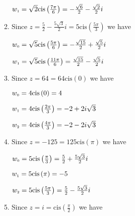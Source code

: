 \documentclass{ximera}
\begin{document}
\begin{enumerate}
\begin{multicols}{2}
$w_{\text{\tiny$1$}} = \sqrt{2}\text{cis}\left(\frac{7\pi}{6}\right) = -\frac{\sqrt{6}}{2}-\frac{\sqrt{2}}{2} i$

\end{multicols}

\item Since $z=\frac{5}{2} - \frac{5\sqrt{3}}{2}i = 5\text{cis}\left(\frac{5\pi}{3}\right)$ we have 

\begin{multicols}{2}

$w_{\text{\tiny$0$}} =\sqrt{5}\text{cis}\left(\frac{5\pi}{6}\right) = -\frac{\sqrt{15}}{2} + \frac{\sqrt{5}}{2}i$

$w_{\text{\tiny$1$}} = \sqrt{5}\text{cis}\left(\frac{11\pi}{6}\right) = \frac{\sqrt{15}}{2} - \frac{\sqrt{5}}{2}i$

\end{multicols}

\item Since $z = 64 = 64\text{cis}\left(0\right)$ we have 

\begin{multicols}{3}

$w_{\text{\tiny$0$}} = 4\text{cis}\left(0\right) = 4$

$w_{\text{\tiny$1$}} =4\text{cis}\left(\frac{2\pi}{3}\right) = -2 + 2i\sqrt{3}$

$w_{\text{\tiny$2$}} = 4\text{cis}\left(\frac{4\pi}{3}\right) =  -2 - 2i\sqrt{3}$

\end{multicols}

\pagebreak

\item Since $z = -125 = 125\text{cis}\left(\pi\right)$ we have 

\begin{multicols}{3}

$w_{\text{\tiny$0$}} = 5\text{cis}\left(\frac{\pi}{3}\right) = \frac{5}{2} + \frac{5\sqrt{3}}{2} i$

$w_{\text{\tiny$1$}} =5\text{cis}\left(\pi\right) = -5$

$w_{\text{\tiny$2$}} = 5\text{cis}\left(\frac{5\pi}{3}\right) = \frac{5}{2} - \frac{5\sqrt{3}}{2} i$

\end{multicols}

\item Since $z = i = \text{cis}\left(\frac{\pi}{2}\right)$ we have 

\begin{multicols}{3}


\end{multicols}
\end{enumerate}
\end{document}
